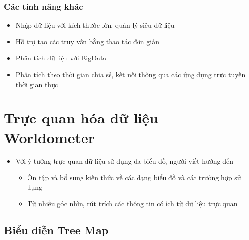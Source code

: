 \documentclass[a4paper, 12pt]{article}
\begin{document}
\subsubsection{Các tính năng khác}

\begin{itemize}
    \item Nhập dữ liệu với kích thước lớn, quản lý siêu dữ liệu
    \item Hỗ trợ tạo các truy vấn bằng thao tác đơn giản
    \item Phân tích dữ liệu với BigData
    \item Phân tích theo thời gian chia sẻ, kết nối thông qua các ứng dụng trực tuyến thời gian thực
\end{itemize}

\clearpage

\section{Trực quan hóa dữ liệu Worldometer}

\begin{itemize}
    \item Với ý tưởng trực quan dữ liệu sử dụng đa biểu đồ, người viết hướng đến
    \begin{itemize}
        \item Ôn tập và bổ sung kiến thức về các dạng biểu đồ và các trường hợp sử dụng
        \item Từ nhiều góc nhìn, rút trích các thông tin có ích từ dữ liệu trực quan
    \end{itemize}
\end{itemize}

\subsection{Biểu diễn Tree Map}
\end{document}
